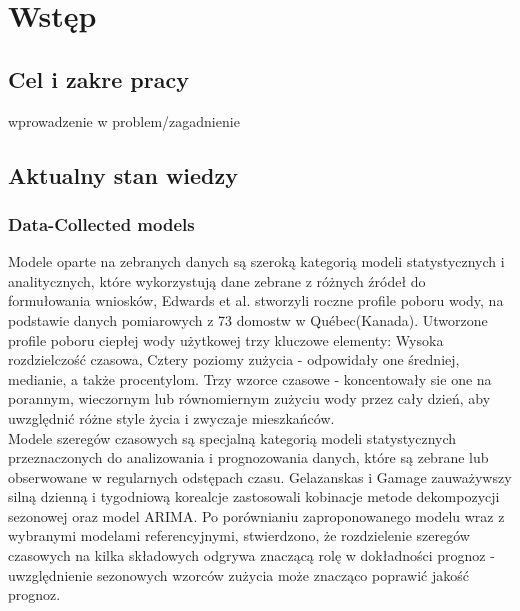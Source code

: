 \documentclass[a4paper,twoside,12pt]{book}
\newcounter{stronyPozaNumeracja}
\begin{document}
\tableofcontents

\setcounter{stronyPozaNumeracja}{\value{page}}
\mainmatter
\pagestyle{empty}

\cleardoublepage

\pagestyle{NumeryStronNazwyRozdzialow}


\chapter{Wstęp}
\label{ch:wstep}
\section{Cel i zakre pracy}
wprowadzenie w problem/zagadnienie
\newpage
\section{Aktualny stan wiedzy}

\subsection{Data-Collected models}
Modele oparte na zebranych danych są szeroką kategorią modeli statystycznych i analitycznych, które wykorzystują dane zebrane z różnych źródeł do formułowania wniosków, Edwards et al.\cite{bib:data_model} stworzyli roczne profile poboru wody, na podstawie danych pomiarowych z 73 domostw w Québec(Kanada). Utworzone profile poboru ciepłej wody użytkowej trzy kluczowe elementy: Wysoka rozdzielczość czasowa, Cztery poziomy zużycia - odpowidały one średniej, medianie, a także procentylom. Trzy wzorce czasowe - koncentowały sie one na porannym, wieczornym lub równomiernym zużyciu wody przez cały dzień, aby uwzględnić różne style życia i zwyczaje mieszkańców.\\

Modele szeregów czasowych są specjalną kategorią modeli statystycznych przeznaczonych do analizowania i prognozowania danych, które są zebrane lub obserwowane w regularnych odstępach czasu. Gelazanskas i Gamage\cite{bib:Time_series} zauważywszy silną dzienną i tygodniową korealcje zastosowali kobinacje metode dekompozycji sezonowej oraz model ARIMA. Po porównianiu zaproponowanego modelu wraz z wybranymi modelami referencyjnymi, stwierdzono, że rozdzielenie szeregów czasowych na kilka składowych odgrywa znaczącą rolę w dokładności prognoz - uwzględnienie sezonowych wzorców zużycia może znacząco poprawić jakość prognoz.\\
\end{document}
